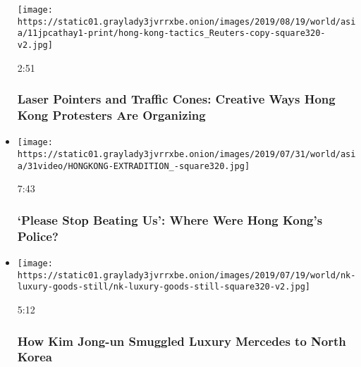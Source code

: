 \begin{itemize}
  \texttt{[image: https://static01.graylady3jvrrxbe.onion/images/2019/08/19/world/asia/11jpcathay1-print/hong-kong-tactics\_Reuters-copy-square320-v2.jpg]}

  2:51

  \hypertarget{laser-pointers-and-traffic-cones-creative-ways-hong-kong-protesters-are-organizing}{%
  \subsubsection{Laser Pointers and Traffic Cones: Creative Ways Hong
  Kong Protesters Are
  Organizing}\label{laser-pointers-and-traffic-cones-creative-ways-hong-kong-protesters-are-organizing}}
\item
  \href{https://www.nytimes3xbfgragh.onion/video/world/asia/100000006624535/hong-kong-protest-police-triad-investigation.html?action=click\&module=video-series-bar\&region=header\&pgtype=Article\&playlistId=video/investigations}{}

  \texttt{[image: https://static01.graylady3jvrrxbe.onion/images/2019/07/31/world/asia/31video/HONGKONG-EXTRADITION\_-square320.jpg]}

  7:43

  \hypertarget{please-stop-beating-us-where-were-hong-kongs-police}{%
  \subsubsection{`Please Stop Beating Us': Where Were Hong Kong's
  Police?}\label{please-stop-beating-us-where-were-hong-kongs-police}}
\item
  \href{https://www.nytimes3xbfgragh.onion/video/world/asia/100000006469635/north-korea-sanctions.html?action=click\&module=video-series-bar\&region=header\&pgtype=Article\&playlistId=video/investigations}{}

  \texttt{[image: https://static01.graylady3jvrrxbe.onion/images/2019/07/19/world/nk-luxury-goods-still/nk-luxury-goods-still-square320-v2.jpg]}

  5:12

  \hypertarget{how-kim-jong-un-smuggled-luxury-mercedes-to-north-korea}{%
  \subsubsection{How Kim Jong-un Smuggled Luxury Mercedes to North
  Korea}\label{how-kim-jong-un-smuggled-luxury-mercedes-to-north-korea}}
\end{itemize}

